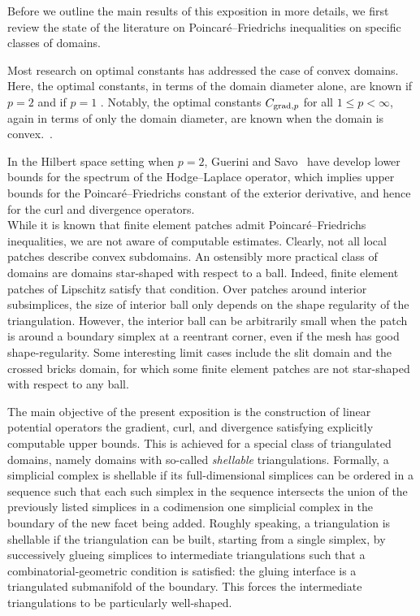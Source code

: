 \documentclass[a4paper]{amsart}
\begin{document}
Before we outline the main results of this exposition in more details, 
we first review the state of the literature on Poincar\'e--Friedrichs inequalities on specific classes of domains. 








Most research on optimal constants has addressed the case of convex domains. 
Here, the optimal constants, in terms of the domain diameter alone, are known if $p=2$ \cite{bebendorf2003note} and if $p=1$ \cite{acosta2004optimal}. 
Notably, the optimal constants $C_{\operatorname{grad},p}$ for all $1 \leq p < \infty$, again in terms of only the domain diameter, are known when the domain is convex.~\cite{esposito2013poincare,ferone2012remark}.

In the Hilbert space setting when $p = 2$, Guerini and Savo~\cite{guerini2004eigenvalue} have develop lower bounds for the spectrum of the Hodge--Laplace operator, which implies upper bounds for the Poincar\'e--Friedrichs constant of the exterior derivative, and hence for the curl and divergence operators.
\\

While it is known that finite element patches admit Poincar\'e--Friedrichs inequalities, 
we are not aware of computable estimates. 
Clearly, not all local patches describe convex subdomains. 
An ostensibly more practical class of domains are domains star-shaped with respect to a ball.
Indeed, finite element patches of Lipschitz satisfy that condition. 
Over patches around interior subsimplices, the size of interior ball only depends on the shape regularity of the triangulation. However, the interior ball can be arbitrarily small when the patch is around a boundary simplex at a reentrant corner, even if the mesh has good shape-regularity. 
Some interesting limit cases include the slit domain and the crossed bricks domain,
for which some finite element patches are not star-shaped with respect to any ball. 




The main objective of the present exposition is the construction of linear potential operators the gradient, curl, and divergence satisfying explicitly computable upper bounds. This is achieved for a special class of triangulated domains,
namely domains with so-called \emph{shellable} triangulations. 
Formally, a simplicial complex is shellable if its full-dimensional simplices can be ordered in a sequence such that each such simplex in the sequence intersects the union of the previously listed simplices in a codimension one simplicial complex in the boundary of the new facet being added. 
Roughly speaking, a triangulation is shellable if the triangulation can be built, starting from a single simplex,
by successively glueing simplices to intermediate triangulations such that a combinatorial-geometric condition is satisfied:
the gluing interface is a triangulated submanifold of the boundary. 
This forces the intermediate triangulations to be particularly well-shaped. 
\end{document}
